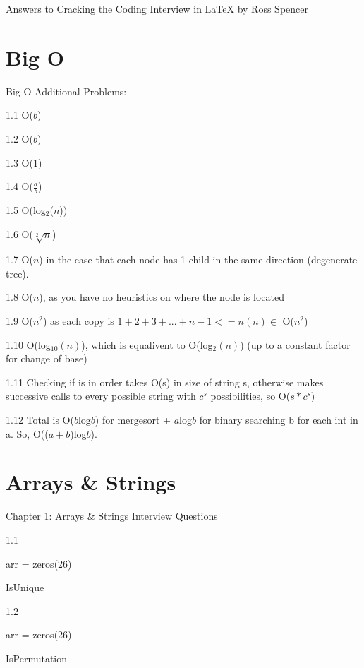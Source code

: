 \documentclass{article}
\begin{document}
Answers to Cracking the Coding Interview in \LaTeX
by Ross Spencer


\section{Big O}
Big O Additional Problems:

1.1 O($b$)

1.2 O($b$)

1.3 O($1$)

1.4 O($\frac{a}{b}$)

1.5 O(log$_2$($n$))

1.6 O($\sqrt[2]{n}$)

1.7 O($n$) in the case that each node has 1 child in the same direction (degenerate tree).

1.8 O($n$), as you have no heuristics on where the node is located

1.9 O($n^2$) as each copy is $1+2+3+...+n-1 <= n(n) \in$ O($n^2$)

1.10 O(log$_10(n)$), which is equalivent to O(log$_2(n)$) (up to a constant factor for change of base)

1.11 Checking if is in order takes O(s) in size of string s, otherwise makes successive calls to every possible string with $c^s$ possibilities, so O($s*c^s$)

1.12 Total is O($b$log$b$) for mergesort + $a$log$b$ for binary searching b for each int in a. So, O(($a+b$)log$b$).


\pagebreak

\section{Arrays \& Strings}
Chapter 1: Arrays \& Strings
Interview Questions


1.1 
\begin{algorithm}
arr = zeros(26)\;
 \caption{IsUnique}

\end{algorithm}

1.2
\begin{algorithm}
arr = zeros(26)\;


 \caption{IsPermutation}

\end{algorithm}
\end{document}
